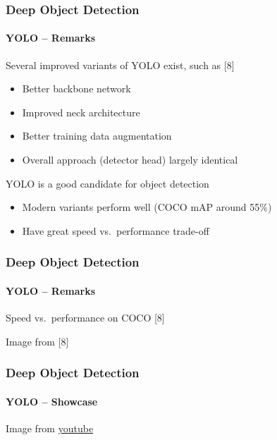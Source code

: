 \documentclass[xetex,professionalfont]{beamer}
\begin{document}
\begin{frame}
	\frametitle{Deep Object Detection}
	\framesubtitle{YOLO -- Remarks}

	Several improved variants of YOLO exist, such as [8]
	\begin{itemize}
		\item Better backbone network
		\item Improved neck architecture
		\item Better training data augmentation
		\item Overall approach (detector head) largely identical
	\end{itemize}

	\bigskip

	YOLO is a good candidate for object detection
	\begin{itemize}
		\item Modern variants perform well (COCO mAP around 55\%)
		\item Have great speed vs.~performance trade-off
	\end{itemize}

\end{frame}


\begin{frame}
	\frametitle{Deep Object Detection}
	\framesubtitle{YOLO -- Remarks}

	Speed vs.~performance on COCO [8]

	\bigskip

	\begin{center}
		{\centering Image from [8]}
	\end{center}

\end{frame}


\begin{frame}
	\frametitle{Deep Object Detection}
	\framesubtitle{YOLO -- Showcase}

	\begin{center}
		{\centering Image from \href{https://www.youtube.com/watch?v=1_SiUOYUoOI}{youtube}}
	\end{center}

\end{frame}
\end{document}
